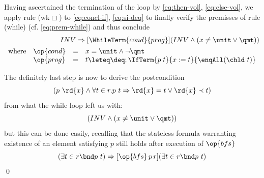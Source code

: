 Having ascertained the termination of the loop by \eqref{eq:then-vol},
\eqref{eq:else-vol}, we apply rule (wk$\Box$) to \eqref{eq:concl-if},
\eqref{eq:si-deq} to finally verify the premisses of rule (while) (cf.
\eqref{eq:prem-while}) and thus conclude
\begin{eqnarray*}
INV \Rightarrow [\WhileTerm{cond}{prog}](INV \land (x \neq \unit \lor \qmt)) \\
\begin{array}{ll@{\quad = \quad}l}
\text{where} & \op{cond} & x =  \unit \land \lnot \qmt \\
  &            \op{prog} & t \leteq \deq; \IfTerm{p\;t}{x:=t}{\enqAll (\chld\ t)}
\end{array}
\end{eqnarray*}

The definitely last step is now to derive the postcondition 
\[
(p\  \rd{x} \land \forall t \in r. p\ t \Rightarrow \rd{x} =  t \lor \rd{x} \prec t)
\]
from what the while loop left us with:
\[
(INV \land (x \neq \unit \lor \qmt)) 
\]
but this can be done easily, recalling that the stateless formula warranting
existence of an element satisfying $p$ still holds after execution of $\op{bfs}$
\[
(\exists t \in r\bnd p\ t) \Rightarrow [\op{bfs}\,p\, r](\exists t \in r\bnd p\ t)
\]
{\hfill \qed}


